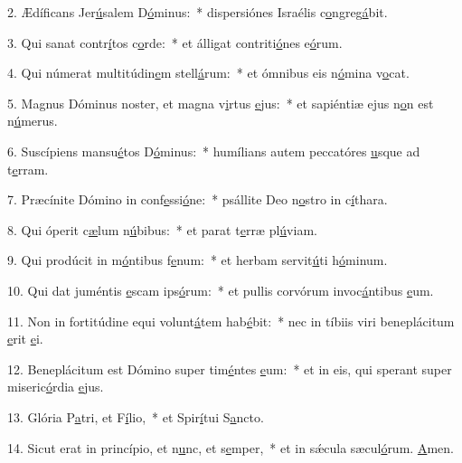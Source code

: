 2. Ædíficans Jer\uline{ú}salem D\uline{ó}minus:~* dispersiónes Israélis c\uline{o}ngreg\uline{á}bit.\par 
3. Qui sanat contr\uline{í}tos c\uline{o}rde:~* et álligat contriti\uline{ó}nes e\uline{ó}rum.\par 
4. Qui númerat multitúdin\uline{e}m stell\uline{á}rum:~* et ómnibus eis n\uline{ó}mina v\uline{o}cat.\par 
5. Magnus Dóminus noster, et magna v\uline{i}rtus \uline{e}jus:~* et sapiéntiæ ejus n\uline{o}n est n\uline{ú}merus.\par 
6. Suscípiens mansu\uline{é}tos D\uline{ó}minus:~* humílians autem peccatóres \uline{u}sque ad t\uline{e}rram.\par 
7. Præcínite Dómino in conf\uline{e}ssi\uline{ó}ne:~* psállite Deo n\uline{o}stro in c\uline{í}thara.\par 
8. Qui óperit c\uline{æ}lum n\uline{ú}bibus:~* et parat t\uline{e}rræ pl\uline{ú}viam.\par 
9. Qui prodúcit in m\uline{ó}ntibus f\uline{e}num:~* et herbam servit\uline{ú}ti h\uline{ó}minum.\par 
10. Qui dat juméntis \uline{e}scam ips\uline{ó}rum:~* et pullis corvórum invoc\uline{á}ntibus \uline{e}um.\par 
11. Non in fortitúdine equi volunt\uline{á}tem hab\uline{é}bit:~* nec in tíbiis viri beneplácitum \uline{e}rit \uline{e}i.\par 
12. Beneplácitum est Dómino super tim\uline{é}ntes \uline{e}um:~* et in eis, qui sperant super miseric\uline{ó}rdia \uline{e}jus.\par 
13. Glória P\uline{a}tri, et F\uline{í}lio,~* et Spir\uline{í}tui S\uline{a}ncto.\par 
14. Sicut erat in princípio, et n\uline{u}nc, et s\uline{e}mper,~* et in sǽcula sæcul\uline{ó}rum. \uline{A}men.\par 
